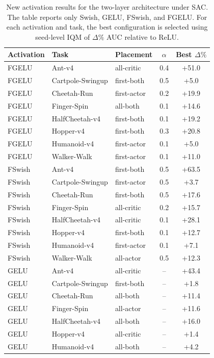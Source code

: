 \begin{table}[t]
\centering
\small
\setlength{\tabcolsep}{4pt}
\renewcommand{\arraystretch}{1.12}
\caption{New activation results for the two-layer architecture under SAC. The table reports only Swish, GELU, FSwish, and FGELU. For each activation and task, the best configuration is selected using seed-level IQM of $\Delta\%$ AUC relative to ReLU.}
\label{tab:new-results-sac-2layers}
\begin{tabular}{lllcc}
\toprule
Activation & Task & Placement & $\alpha$ & Best $\Delta\%$ \\
\midrule
FGELU & Ant-v4 & all-critic & 0.4 & +51.0 \\
FGELU & Cartpole-Swingup & first-both & 0.5 & +5.0 \\
FGELU & Cheetah-Run & first-actor & 0.2 & +19.9 \\
FGELU & Finger-Spin & all-both & 0.1 & +14.6 \\
FGELU & HalfCheetah-v4 & first-both & 0.1 & +19.2 \\
FGELU & Hopper-v4 & first-both & 0.3 & +20.8 \\
FGELU & Humanoid-v4 & first-actor & 0.1 & +5.0 \\
FGELU & Walker-Walk & first-actor & 0.1 & +11.0 \\
FSwish & Ant-v4 & first-both & 0.5 & +63.5 \\
FSwish & Cartpole-Swingup & first-actor & 0.5 & +3.7 \\
FSwish & Cheetah-Run & first-both & 0.5 & +17.6 \\
FSwish & Finger-Spin & all-critic & 0.2 & +15.7 \\
FSwish & HalfCheetah-v4 & all-critic & 0.1 & +28.1 \\
FSwish & Hopper-v4 & first-both & 0.1 & +12.7 \\
FSwish & Humanoid-v4 & first-actor & 0.1 & +7.1 \\
FSwish & Walker-Walk & all-actor & 0.5 & +12.3 \\
GELU & Ant-v4 & all-critic & -- & +43.4 \\
GELU & Cartpole-Swingup & first-both & -- & +1.8 \\
GELU & Cheetah-Run & all-both & -- & +11.4 \\
GELU & Finger-Spin & all-actor & -- & +11.6 \\
GELU & HalfCheetah-v4 & all-both & -- & +16.0 \\
GELU & Hopper-v4 & all-critic & -- & +1.4 \\
GELU & Humanoid-v4 & all-both & -- & +4.2 \\

\end{tabular}
\end{table}

